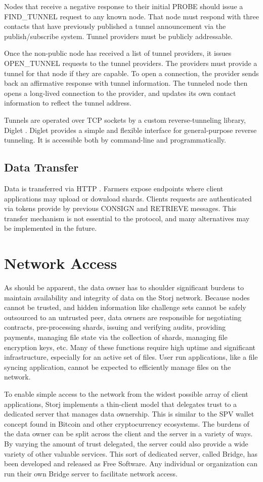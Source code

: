 \documentclass[a4paper,10pt]{article}
\begin{document}
Nodes that receive a negative response to their initial PROBE should issue a FIND\_TUNNEL request to any known node. That node must respond with three contacts that have previously published a tunnel announcement via the publish/subscribe system. Tunnel providers must be publicly addressable.

Once the non-public node has received a list of tunnel providers, it issues OPEN\_TUNNEL requests to the tunnel providers. The providers must provide a tunnel for that node if they are capable. To open a connection, the provider sends back an affirmative response with tunnel information. The tunneled node then opens a long-lived connection to the provider, and updates its own contact information to reflect the tunnel address.

Tunnels are operated over TCP sockets by a custom reverse-tunneling library, Diglet \cite{14}. Diglet provides a simple and flexible interface for general-purpose reverse tunneling. It is accessible both by command-line and programmatically.

\subsection{Data Transfer}
Data is transferred via HTTP \cite{15}. Farmers expose endpoints where client applications may upload or download shards. Clients requests are authenticated via tokens provide by previous CONSIGN and RETRIEVE messages. This transfer mechanism is not essential to the protocol, and many alternatives may be implemented in the future.


\section{Network Access}
As should be apparent, the data owner has to shoulder significant burdens to maintain availability and integrity of data on the Storj network. Because nodes cannot be trusted, and hidden information like challenge sets cannot be safely outsourced to an untrusted peer, data owners are responsible for negotiating contracts, pre-processing shards, issuing and verifying audits, providing payments, managing file state via the collection of shards, managing file encryption keys, etc. Many of these functions require high uptime and significant infrastructure, especially for an active set of files. User run applications, like a file syncing application, cannot be expected to efficiently manage files on the network.

To enable simple access to the network from the widest possible array of client applications, Storj implements a thin-client model that delegates trust to a dedicated server that manages data ownership. This is similar to the SPV wallet concept found in Bitcoin and other cryptocurrency ecosystems. The burdens of the data owner can be split across the client and the server in a variety of ways. By varying the amount of trust delegated, the server could also provide a wide variety of other valuable services. This sort of dedicated server, called Bridge, has been developed and released as Free Software. Any individual or organization can run their own Bridge server to facilitate network access.
\end{document}
